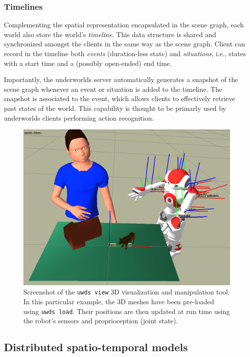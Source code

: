 \documentclass[letterpaper, 10 pt, conference]{ieeeconf}  %
\newcommand{\ie}{i.e.,\xspace}
\newcommand{\uwds}{{\sc underworlds}\xspace}
\begin{document}
\subsubsection{Timelines}

Complementing the spatial representation encapsulated in the scene graph, each
world also store the world's \emph{timeline}. This data structure is shared
and synchronized amongst the clients in the same way as the scene graph.
Client can record in the timeline both \emph{events} (duration-less state) and
\emph{situations}, \ie states with a start time and a (possibly open-ended) end time.

Importantly, the \uwds server automatically generates a snapshot of
the scene graph whenever an event or situation is added to the timeline. The
snapshot is associated to the event, which allows clients to effectively retrieve past
states of the world. This capability is thought to be primarly used by \uwds clients
performing action recognition.

\begin{figure}
    \centering
    \includegraphics[width=\linewidth]{uwds-screenshot}
    \caption{Screenshot of the {\tt uwds view} 3D visualization and manipulation
    tool. In this particular example, the 3D meshes have been pre-loaded using
    {\tt uwds load}. Their positions are then updated at run time using the
    robot's sensors and proprioception (joint state).}
    \label{fig|uwds-view}
\end{figure}

\subsection{Distributed spatio-temporal models}
\label{arch}
\end{document}
